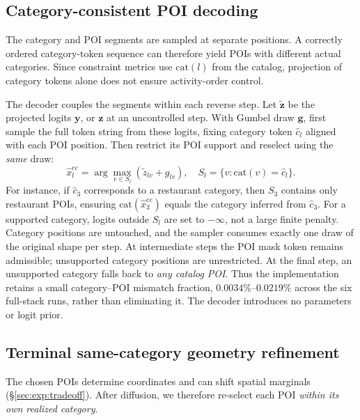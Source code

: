 \subsection{Category-consistent POI decoding}
\label{sec:method:decoding}
The category and POI segments are sampled at separate positions. A correctly
ordered category-token sequence can therefore yield POIs with different actual
categories. Since constraint metrics use $\mathrm{cat}(l)$ from the catalog,
projection of category tokens alone does not ensure activity-order control.

The decoder couples the segments within each reverse step. Let $\widetilde{\mathbf z}$
be the projected logits $\mathbf y$, or $\mathbf z$ at an uncontrolled step.
With Gumbel draw $\mathbf{g}$, first sample the full token string from these logits,
fixing category token $\hat c_l$ aligned with each POI position. Then restrict its
POI support and reselect using the \emph{same} draw:
\begin{equation}
 \hat x^{\mathrm{cc}}_l=\arg\max_{v\in S_l}(\widetilde z_{lv}+g_{lv}),
 \quad S_l=\{v:\mathrm{cat}(v)=\hat c_l\}.
 \label{eq:ccdecode}
\end{equation}
For instance, if $\hat c_3$ corresponds to a restaurant category, then $S_3$ contains only restaurant POIs, ensuring $\mathrm{cat}(\hat x^{\mathrm{cc}}_3)$ equals the category inferred from $\hat c_3$.
For a supported category, logits outside $S_l$ are set to $-\infty$, not a large
finite penalty. Category positions are untouched, and the sampler consumes
exactly one draw of the original shape per step. At intermediate steps the POI
mask token remains admissible; unsupported category positions are unrestricted.
At the final step, an unsupported category falls back to \emph{any catalog POI}.
Thus the implementation retains a small category--POI mismatch fraction,
$0.0034\%$--$0.0219\%$ across the six full-stack runs, rather than eliminating it.
The decoder introduces no parameters or logit prior.

\subsection{Terminal same-category geometry refinement}
\label{sec:method:geometry}
The chosen POIs determine coordinates and can shift spatial marginals
(\S\ref{sec:exp:tradeoff}). After diffusion, we therefore re-select each POI
\emph{within its own realized category}.

